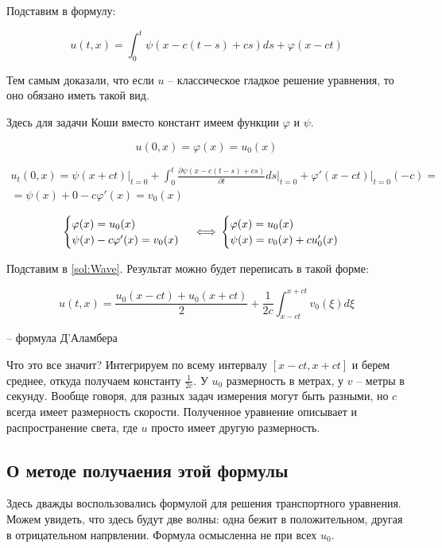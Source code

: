 \documentclass[12pt]{report}
\begin{document}
Подставим в формулу: 

\begin{equation} \label{sol:Wave}
    u(t, x) = \int^{t}_{0}{\psi(x - c(t - s) + cs)ds} + \varphi (x - ct)
\end{equation} 

Тем самым доказали, что если $u$ -- классическое гладкое решение уравнения, то оно обязано иметь такой вид. 

Здесь для задачи Коши вместо констант имеем функции $\varphi$ и $\psi$.

$$u(0, x) = \varphi(x) = u_0(x)$$

$$
\begin{gathered}
    u_t(0, x) = \psi(x+ct) \vert_{t=0} + \int^{t}_{0}{\frac{\partial \psi(x - c(t - s) + cs)}{\partial t} ds} \vert_{t = 0} + \varphi ' (x - ct) \vert_{t = 0} (-c) =
    \\
    = \psi(x) + 0 - c \varphi ' (x) = v_0(x)
\end{gathered}
$$

\[
    \begin{cases}
        \varphi(x) = u_0(x)
        \\
        \psi(x) - c \varphi ' (x) = v_0(x)
    \end{cases}
    \\
    \Longleftrightarrow
    \\
    \begin{cases}
        \varphi(x) = u_0(x)
        \\
        \psi(x) = v_0(x) + cu'_0(x)
    \end{cases}
\]

Подставим в \eqref{sol:Wave}. Результат можно будет переписать в такой форме: 

\begin{equation} \label{for:DAlam}
    u(t,x) = \frac{u_0(x - ct) + u_0(x + ct)}{2} + \frac{1}{2c} \int^{x + ct}_{x - ct}{v_0(\xi) d \xi}
\end{equation}

-- формула Д'Аламбера

Что это все значит? Интегрируем по всему интервалу $[x - ct, x + ct]$ и берем среднее, откуда получаем константу $\frac{1}{2c}$. У $u_0$ размерность в метрах, у $v$ -- метры в секунду. Вообще говоря, для разных задач измерения могут быть разными, но $c$ всегда имеет размерность скорости. Полученное уравнение описывает и распространение света, где $u$ просто имеет другую размерность.

\subsection{О методе получаения этой формулы}
 Здесь дважды воспользовались формулой для решения транспортного уравнения. Можем увидеть, что здесь будут две волны: одна бежит в положительном, другая в отрицательном напрвлении. Формула осмысленна не при всех $u_0$.
 
\end{document}
